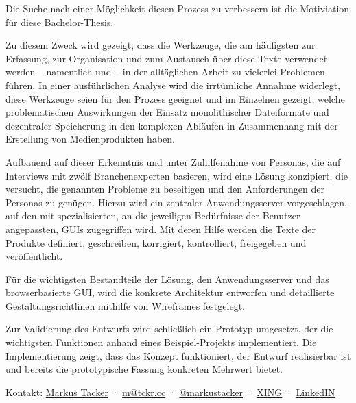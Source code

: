 \documentclass[11pt,a4paper]{article}
\begin{document}
Die Suche nach einer Möglichkeit diesen Prozess zu verbessern ist die Motiviation für diese Bachelor-Thesis. 

Zu diesem Zweck wird gezeigt, dass die Werkzeuge, die am häufigsten zur Erfassung, zur Organisation und zum Austausch über diese Texte verwendet werden -- namentlich  und  -- in der alltäglichen Arbeit zu vielerlei Problemen führen. In einer ausführlichen Analyse wird die irrtümliche Annahme widerlegt, diese Werkzeuge seien für den Prozess geeignet und im Einzelnen gezeigt, welche problematischen Auswirkungen der Einsatz monolithischer Dateiformate und dezentraler Speicherung in den komplexen Abläufen in Zusammenhang mit der Erstellung von Medienprodukten haben.

Aufbauend auf dieser Erkenntnis und unter Zuhilfenahme von Personas, die auf Interviews mit zwölf Branchenexperten basieren, wird eine Lösung konzipiert, die versucht, die genannten Probleme zu beseitigen und den Anforderungen der Personas zu genügen. Hierzu wird ein zentraler Anwendungsserver vorgeschlagen, auf den mit spezialisierten, an die jeweiligen Bedürfnisse der Benutzer angepassten, GUIs zugegriffen wird. Mit deren Hilfe werden die Texte der Produkte definiert, geschreiben, korrigiert, kontrolliert, freigegeben und veröffentlicht.

Für die wichtigsten Bestandteile der Lösung, den Anwendungsserver und das browserbasierte GUI, wird die konkrete Architektur entworfen und detaillierte Gestaltungsrichtlinen mithilfe von Wireframes festgelegt.

Zur Validierung des Entwurfs wird schließlich ein Prototyp umgesetzt, der die wichtigsten Funktionen anhand eines Beispiel-Projekts implementiert. Die Implementierung zeigt, dass das Konzept funktioniert, der Entwurf realisierbar ist und bereits die prototypische Fassung konkreten Mehrwert bietet.

\begin{center}
\begin{small}
Kontakt: \href{http://tckr.cc/}{Markus Tacker} · \href{mailto:m@tckr.cc}{m@tckr.cc} · \href{http://twitter.com/markustacker}{@markustacker} · \href{https://www.xing.com/profile/Markus_Tacker}{XING} · \href{http://www.linkedin.com/in/markustacker}{LinkedIN}
\end{small}
\end{center}
\end{document}
